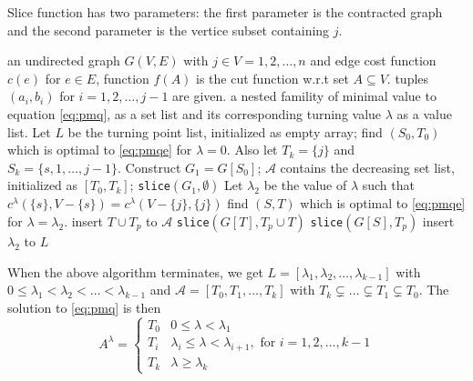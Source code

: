 \documentclass{article}
\begin{document}
Slice function has two parameters:
the first parameter is the contracted graph and the second parameter is the vertice subset containing $j$.
\begin{algorithm}
\begin{algorithmic}[1]
\REQUIRE an undirected graph $G(V, E)$ with $j \in V={1,2,\dots, n}$ and edge cost function $c(e)$ for $e \in E$, function $f(A)$ is the cut function w.r.t set $A\subseteq V$. tuples $(a_i, b_i)$ for $i=1,2,\dots, j-1$ are given.
\ENSURE a nested famility of minimal value to equation \eqref{eq:pmq}, as a set list and its corresponding turning value $\lambda$ as a value list.
\STATE Let $L$ be the turning point list, initialized as empty array;
\STATE find $(S_0, T_0)$ which is optimal to \eqref{eq:pmqe} for $ \lambda  = 0$.  Also let $T_k = \{j\}$ and $S_k = \{s, 1, \dots, j-1\}$. Construct $G_1 = G[S_0]$;
\STATE $\mathcal{A}$ contains the decreasing set list, initialized as $[T_0, T_k]$;
\STATE \texttt{slice}$(G_1, \emptyset)$
  \STATE Let $\lambda_2$ be the value of $\lambda$ such that $c^{\lambda}(\{s\}, V-\{s\}) = 
c^{\lambda}(V-\{j\}, \{j\})$
\STATE find $(S, T)$ which is optimal to \eqref{eq:pmqe} for $\lambda = \lambda_2$.
\STATE insert $T\cup T_p$ to $\mathcal{A}$
\STATE \texttt{slice}$(G[T], T_p\cup T)$
\STATE \texttt{slice}$(G[S], T_p)$
\ELSE
\STATE insert $\lambda_2$ to $L$ 
\ENDIF
\ENDFUNCTION
\end{algorithmic}
\end{algorithm}
When the above algorithm terminates, we get $L=[\lambda_1, \lambda_2, \dots, \lambda_{k-1}]$ with
$0\leq \lambda_1 < \lambda_2 < \dots < \lambda_{k-1}$ and $\mathcal{A} = [T_0, T_1, \dots, T_k]$ with
$T_k \subsetneq  \dots \subsetneq T_1 \subsetneq T_0$.  The solution to \eqref{eq:pmq} is then
\begin{equation}
A^{\lambda}=\begin{cases}
T_0 & 0 \leq \lambda < \lambda_1 \\
T_i & \lambda_i \leq \lambda < \lambda_{i+1}, \textrm{ for } i=1, 2, \dots, k-1 \\
T_k & \lambda \geq \lambda_{k}
\end{cases}
\end{equation}
\end{document}
